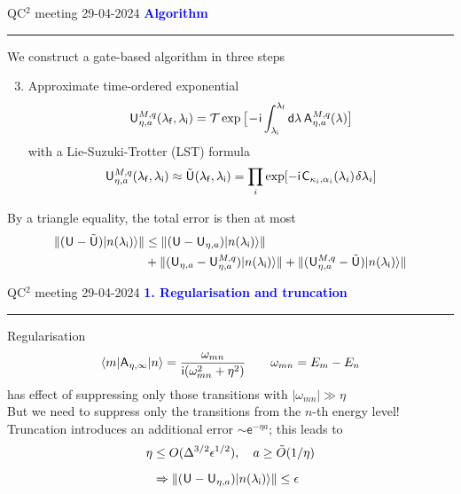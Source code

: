 \documentclass{beamer}
\def\lbt{\small QC$^2$ meeting 29-04-2024} %
\def\mt#1{\kern0.025em\mathsf{#1}\kern0.025em}
\def\d{\mathsf d}
\def\e{\mathsf e}
\def\i{\mathsf i}
\def\lambdai{{\lambda_{\sf i}}}
\def\lambdaf{{\lambda_{\sf f}}}
\def\A{\mt A}
\def\>{\kern0.08em}
\newenvironment{dia}[2]
{
	\begin{frame}
	\vspace{1mm}
	{\small #1}
	\hfill
    {\small\bf\textcolor{blue}{#2}}
	\vspace{3mm}
	\hrule
	\bigskip
}
{
	\vfill
	\end{frame}
}
\begin{document}
\begin{dia}{\lbt}{Algorithm}
We construct a gate-based algorithm in three steps
\begin{enumerate}
    \setcounter{enumi}{2}
    \item Approximate time-ordered exponential
    \begin{align*}
        \mt U_{\eta, a}^{M, q}(\lambdaf, \lambdai) = \mathcal T \exp\big[ \!-\!\i \int_\lambdai^\lambdaf \d\lambda \, \A_{\eta, a}^{M, q}(\lambda) \big]
    \end{align*}
    with a Lie-Suzuki-Trotter (LST) formula
    \begin{align*}
        \mt U_{\eta, a}^{M, q}(\lambdaf, \lambdai) \approx \tilde{\mt U}(\lambdaf, \lambdai) = \prod_i \exp[-\i \> \mt C_{\kappa_i, \alpha_i}(\lambda_i) \> \delta\lambda_i]
    \end{align*}
\end{enumerate} \pause
By a triangle equality, the total error is then at most
\begin{align*}
    \|(\mt U - \tilde{\mt U})\ket{n(\lambdai)}\| &\leq \|(\mt U - \mt U_{\eta, a})\ket{n(\lambdai)}\| \\
    &+ \|(\mt U_{\eta, a} - \mt U_{\eta, a}^{M, q})\ket{n(\lambdai)}\| + \|(\mt U_{\eta, a}^{M, q} - \tilde{\mt U})\ket{n(\lambdai)}\|
\end{align*}
\vspace{-1cm}
\end{dia}

\begin{dia}{\lbt}{1. Regularisation and truncation}
Regularisation
\begin{align*}
    \bra m \A_{\eta, \infty} \ket n = \frac{\omega_{mn}}{\i (\omega_{mn}^2 + \eta^2)} \quad \quad \omega_{mn} = E_m - E_n
\end{align*}
has effect of suppressing only those transitions with $|\omega_{mn}| \gg \eta$ \\[4mm] \pause
But we need to suppress only the transitions from the $n$-th energy level! \\[4mm] \pause
Truncation introduces an additional error $\sim \e^{-\eta a}$; this leads to
\begin{align*}
    \eta &\leq O(\Delta^{3/2}\epsilon^{1/2}), \quad a \geq \tilde O(1 / \eta) \\[2mm]
    & \Rightarrow \|(\mt U - \mt U_{\eta, a})\ket{n(\lambdai)}\| \leq \epsilon
\end{align*}
\vspace{-1cm}
\end{dia}
\end{document}
